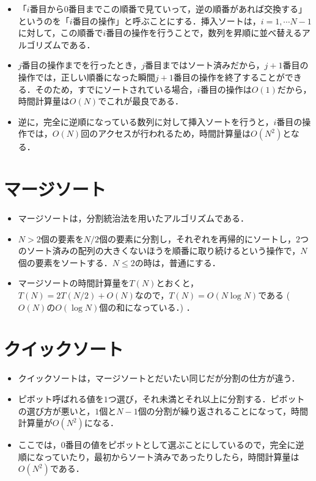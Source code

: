 \documentclass[slide,20pt]{ltjsarticle}
\begin{document}
\begin{itemize}
  \item 「$i$番目から$0$番目までこの順番で見ていって，逆の順番があれば交換する」というのを「$i$番目の操作」と呼ぶことにする．挿入ソートは，$i = 1, \cdots N - 1$に対して，この順番で$i$番目の操作を行うことで，数列を昇順に並べ替えるアルゴリズムである．
  \item $j$番目の操作までを行ったとき，$j$番目まではソート済みだから，$j + 1$番目の操作では，正しい順番になった瞬間$j + 1$番目の操作を終了することができる．そのため，すでにソートされている場合，$i$番目の操作は$O(1)$だから，時間計算量は$O(N)$でこれが最良である．
  \item 逆に，完全に逆順になっている数列に対して挿入ソートを行うと，$i$番目の操作では，$O(N)$回のアクセスが行われるため，時間計算量は$O(N ^ 2)$となる．
\end{itemize}

\section{マージソート}

\begin{itemize}
  \item マージソートは，分割統治法を用いたアルゴリズムである．
  \item $N > 2$個の要素を$N / 2$個の要素に分割し，それぞれを再帰的にソートし，$2$つのソート済みの配列の大きくないほうを順番に取り続けるという操作で，$N$個の要素をソートする．$N \le 2$の時は，普通にする．
  \item マージソートの時間計算量を$T(N)$とおくと，$T(N) = 2T(N / 2) + O(N)$なので，$T(N) = O(N \log N)$である ($O(N)$の$O(\log N)$個の和になっている．) ．
\end{itemize}

\section{クイックソート}

\begin{itemize}
  \item クイックソートは，マージソートとだいたい同じだが分割の仕方が違う．
  \item ピボット呼ばれる値を$1$つ選び，それ未満とそれ以上に分割する．ピボットの選び方が悪いと，$1$個と$N - 1$個の分割が繰り返されることになって，時間計算量が$O(N ^ 2)$になる．
  \item ここでは，$0$番目の値をピボットとして選ぶことにしているので，完全に逆順になっていたり，最初からソート済みであったりしたら，時間計算量は$O(N ^ 2)$である．
\end{itemize}
\end{document}
